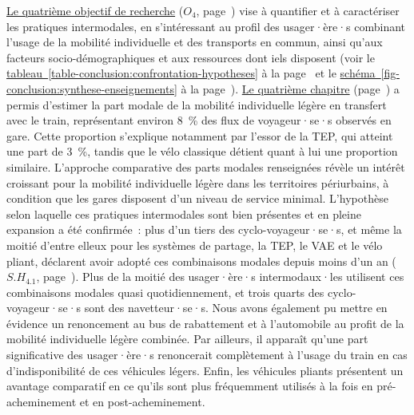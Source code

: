 \begin{refsegment}
\hyperref[objectif-4]{Le quatrième objectif de recherche} (\(O_4\), page~\pageref{objectif-4}) vise à quantifier et à caractériser les pratiques intermodales, en s'intéressant au profil des usager·ère·s combinant l'usage de la mobilité individuelle et des transports en commun, ainsi qu'aux facteurs socio-démographiques et aux ressources dont iels disposent (voir le \hyperref[table-conclusion:confrontation-hypotheses]{tableau~\ref{table-conclusion:confrontation-hypotheses}} à la page~\pageref{table-conclusion:confrontation-hypotheses} et le \hyperref[fig-conclusion:synthese-enseignements]{schéma~\ref{fig-conclusion:synthese-enseignements}} à la page~\pageref{fig-conclusion:synthese-enseignements}). \hyperref[chap4:titre]{Le quatrième chapitre} (page~\pageref{chap4:titre}) a permis d'estimer la part modale de la mobilité individuelle légère en transfert avec le train, représentant environ 8~\% des flux de voyageur·se·s observés en gare. Cette proportion s'explique notamment par l'essor de la \acrfull{TEP}, qui atteint une part de 3~\%, tandis que le vélo classique détient quant à lui une proportion similaire. L'approche comparative des parts modales renseignées révèle un intérêt croissant pour la mobilité individuelle légère dans les territoires périurbains, à condition que les gares disposent d'un niveau de service minimal. L'hypothèse selon laquelle ces pratiques intermodales sont bien présentes et en pleine expansion a été confirmée~: plus d'un tiers des cyclo-voyageur·se·s, et même la moitié d'entre elleux pour les systèmes de partage, la \acrshort{TEP}, le \acrfull{VAE} et le vélo pliant, déclarent avoir adopté ces combinaisons modales depuis moins d'un an (\hyperref[sous-hypothese-4.1]{\(S.H_{4.1}\)}, page~\pageref{sous-hypothese-4.1}). Plus de la moitié des usager·ère·s intermodaux·les utilisent ces combinaisons modales quasi quotidiennement, et trois quarts des cyclo-voyageur·se·s sont des navetteur·se·s. Nous avons également pu mettre en évidence un renoncement au bus de rabattement et à l'automobile au profit de la mobilité individuelle légère combinée. Par ailleurs, il apparaît qu'une part significative des usager·ère·s renoncerait complètement à l’usage du train en cas d’indisponibilité de ces véhicules légers. Enfin, les véhicules pliants présentent un avantage comparatif en ce qu’ils sont plus fréquemment utilisés à la fois en pré-acheminement et en post-acheminement.%


\end{refsegment}
